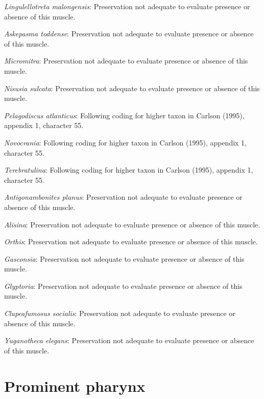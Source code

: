 \documentclass[]{book}
\theoremstyle{definition}
\theoremstyle{definition}
\theoremstyle{definition}
\theoremstyle{remark}
\begin{document}
\emph{Lingulellotreta malongensis}: Preservation not adequate to
evaluate presence or absence of this muscle.

\emph{Askepasma toddense}: Preservation not adequate to evaluate
presence or absence of this muscle.

\emph{Micromitra}: Preservation not adequate to evaluate presence or
absence of this muscle.

\emph{Nisusia sulcata}: Preservation not adequate to evaluate presence
or absence of this muscle.

\emph{Pelagodiscus atlanticus}: Following coding for higher taxon in
Carlson (1995), appendix 1, character 55.

\emph{Novocrania}: Following coding for higher taxon in Carlson (1995),
appendix 1, character 55.

\emph{Terebratulina}: Following coding for higher taxon in Carlson
(1995), appendix 1, character 55.

\emph{Antigonambonites planus}: Preservation not adequate to evaluate
presence or absence of this muscle.

\emph{Alisina}: Preservation not adequate to evaluate presence or
absence of this muscle.

\emph{Orthis}: Preservation not adequate to evaluate presence or absence
of this muscle.

\emph{Gasconsia}: Preservation not adequate to evaluate presence or
absence of this muscle.

\emph{Glyptoria}: Preservation not adequate to evaluate presence or
absence of this muscle.

\emph{Clupeafumosus socialis}: Preservation not adequate to evaluate
presence or absence of this muscle.

\emph{Yuganotheca elegans}: Preservation not adequate to evaluate
presence or absence of this muscle.

\hypertarget{prominent-pharynx}{%
\section*{Prominent pharynx}\label{prominent-pharynx}}
\end{document}

